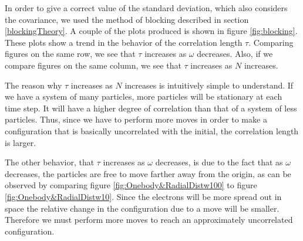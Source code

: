 \documentclass[english, a4paper]{article}
\begin{document}
	
	
	In order to give a correct value of the standard deviation, which also considers the covariance, we used the method of blocking described in section \ref{blockingTheory}. A couple of the plots produced is shown in figure \ref{fig:blocking}. These plots show a trend in the behavior of the correlation length $\tau$. Comparing figures on the same row, we see that $\tau$ increases as $\omega$ decreases. Also, if we compare figures on the same column, we see that $\tau$ increases as $N$ increases.
	
	The reason why $\tau$ increases as $N$ increases is intuitively simple to understand. If we have a system of many particles, more particles will be stationary at each time step. It will have a higher degree of correlation than that of a system  of less particles. Thus, since we have to perform more moves in order to make a configuration that is basically uncorrelated with the initial, the correlation length is larger.
	
	The other behavior, that $\tau$ increases as $\omega$ decreases, is due to the fact that as $\omega$ decreases, the particles are free to move farther away from the origin, as can be observed by comparing figure \ref{fig:Onebody&RadialDistw100} to figure \ref{fig:Onebody&RadialDistw10}. Since the electrons will be more spread out in space the relative change in the configuration due to a move will be smaller. Therefore we must perform more moves to reach an approximately uncorrelated configuration.                                                                                                                                                                                                                                                       
	
\end{document}
